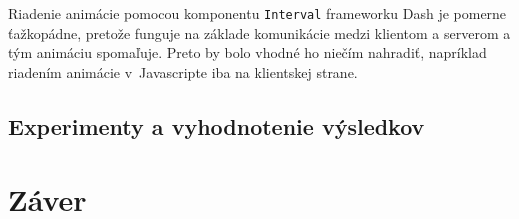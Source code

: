 Riadenie animácie pomocou komponentu \texttt{Interval} frameworku Dash je pomerne ťažkopádne, pretože funguje na základe komunikácie medzi klientom a serverom a tým animáciu spomaľuje. Preto by bolo vhodné ho niečím nahradiť, napríklad riadením animácie v~Javascripte iba na klientskej strane.



\section{Experimenty a vyhodnotenie výsledkov}

\chapter{Záver}



%

